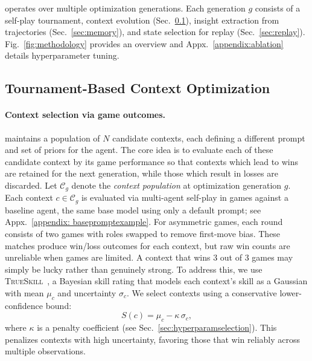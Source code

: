 
\NAME{} operates over multiple optimization generations. Each generation $g$ consists of a self-play tournament, context evolution (Sec.~\ref{sec:prompt_optimization}), insight extraction from trajectories (Sec.~\ref{sec:memory}), and state selection for replay (Sec.~\ref{sec:replay}). Fig.~\ref{fig:methodology} provides an overview and Appx.~\ref{appendix:ablation} details hyperparameter tuning.



\subsection{Tournament-Based Context Optimization}\label{sec:prompt_optimization}


\paragraph{Context selection via game outcomes.}
 \NAME{} maintains a population of $N$ candidate contexts, each defining a different prompt and set of priors for the agent. The core idea is to evaluate each of these candidate context by its game performance so that contexts which lead to wins are retained for the next generation, while those which result in losses are discarded. Let $\mathcal{C}_g$ denote the \emph{context population} at optimization generation $g$. Each context $c\in\mathcal{C}_g$ is evaluated via multi-agent self-play in games against a baseline agent, the same base model using only a default prompt; see Appx.~\ref{appendix: basepromptexample}. For asymmetric games, each round consists of two games with roles swapped to remove first-move bias. These matches produce win/loss outcomes for each context, but raw win counts are unreliable when games are limited. A context that wins 3 out of 3 games may simply be lucky rather than genuinely strong. To address this, we use \textsc{TrueSkill}~\citep{herbrich2006trueskill}, a Bayesian skill rating that models each context's skill as a Gaussian with mean $\mu_c$ and uncertainty $\sigma_c$. We select contexts using a conservative lower-confidence bound: \begin{equation} \label{equation:TrueSKill} S(c)=\mu_c-\kappa\,\sigma_c, \end{equation} where $\kappa$ is a penalty coefficient (see Sec.~\ref{sec:hyperparamselection}). This penalizes contexts with high uncertainty, favoring those that win reliably across multiple observations.


